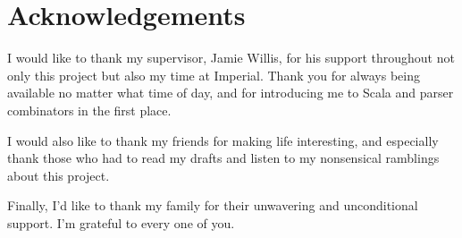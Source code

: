 \documentclass[../../main.tex]{subfiles}
\begin{document}
\hspace{0pt}
\vfill
\section*{\centering Acknowledgements}
\noindent
I would like to thank my supervisor, Jamie Willis, for his support throughout not only this project but also my time at Imperial.
Thank you for always being available no matter what time of day, and for introducing me to Scala and parser combinators in the first place.
\newline

\noindent
I would also like to thank my friends for making life interesting, and especially thank those who had to read my drafts and listen to my nonsensical ramblings about this project.
\newline

\noindent
Finally, I'd like to thank my family for their unwavering and unconditional support.
I'm grateful to every one of you.
\vfill
\hspace{0pt}
\end{document}
